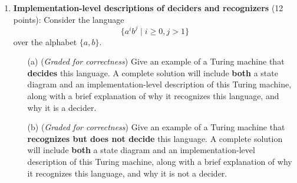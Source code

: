 \documentclass[12pt, oneside]{article}
\newcommand{\gradeCorrect}{({\it Graded for correctness}) }
\begin{document}
\begin{enumerate}[wide, labelwidth=!, labelindent=0pt]
\begin{enumerate}
        \item\gradeCorrect Specify an example string $w_2$ of length $3$ over $\Sigma$ 
        that is {\bf rejected} by this Turing machine
        or explain why there is no such 
        example. A complete solution will include either (1) a precise and clear 
        description of your example  string and a precise and clear description of the rejecting computation
        of the Turing machine on this string or (2) a sufficiently
        general and correct argument why there is no such example, referring back to the relevant definitions.

        \item\gradeCorrect Specify an example string $w_3$ of length $3$ over $\Sigma$ 
        on which  the computation of this Turing machine is {\bf never halts}
        or explain why there is no such 
        example. A complete solution will include either (1) a precise and clear 
        description of your example  string and a precise and clear description of the looping (non-halting) 
        computation
        of the Turing machine on this string or (2) a sufficiently
        general and correct argument why there is no such example, referring back to the relevant definitions.

\end{enumerate}



\item\textbf{Implementation-level descriptions of deciders and recognizers} (12 points): Consider the language $$\{a^i b^j \mid i \geq 0, j > 1\}$$
over the alphabet $\{a,b\}$.

\begin{enumerate}
\item[(a)]\gradeCorrect Give an example of a Turing machine that {\bf decides} this language.
A complete solution will include  {\bf both} a state diagram and an implementation-level description 
of this Turing machine, along with a brief explanation of why it recognizes this language, and why it is a decider.

\item[(b)]\gradeCorrect Give an example of a Turing machine that {\bf recognizes but does not decide} this language.
A complete solution will include  {\bf both} a state diagram and an implementation-level description 
of this Turing machine, along with a brief explanation of why it recognizes this language, and why it is not a decider.

\end{enumerate}


\end{enumerate}
\end{document}

